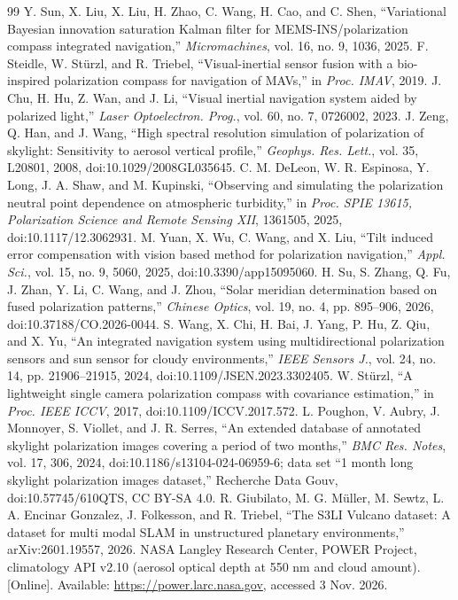 \begin{thebibliography}{99}
 Y. Sun, X. Liu, X. Liu, H. Zhao, C. Wang, H. Cao, and C. Shen, ``Variational Bayesian innovation saturation Kalman filter for MEMS-INS/polarization compass integrated navigation,'' \emph{Micromachines}, vol. 16, no. 9, 1036, 2025.
 F. Steidle, W. St\"urzl, and R. Triebel, ``Visual-inertial sensor fusion with a bio-inspired polarization compass for navigation of MAVs,'' in \emph{Proc. IMAV}, 2019.
 J. Chu, H. Hu, Z. Wan, and J. Li, ``Visual inertial navigation system aided by polarized light,'' \emph{Laser Optoelectron. Prog.}, vol. 60, no. 7, 0726002, 2023.
 J. Zeng, Q. Han, and J. Wang, ``High spectral resolution simulation of polarization of skylight: Sensitivity to aerosol vertical profile,'' \emph{Geophys. Res. Lett.}, vol. 35, L20801, 2008, doi:10.1029/2008GL035645.
 C. M. DeLeon, W. R. Espinosa, Y. Long, J. A. Shaw, and M. Kupinski, ``Observing and simulating the polarization neutral point dependence on atmospheric turbidity,'' in \emph{Proc. SPIE 13615, Polarization Science and Remote Sensing XII}, 1361505, 2025, doi:10.1117/12.3062931.
 M. Yuan, X. Wu, C. Wang, and X. Liu, ``Tilt induced error compensation with vision based method for polarization navigation,'' \emph{Appl. Sci.}, vol. 15, no. 9, 5060, 2025, doi:10.3390/app15095060.
 H. Su, S. Zhang, Q. Fu, J. Zhan, Y. Li, C. Wang, and J. Zhou, ``Solar meridian determination based on fused polarization patterns,'' \emph{Chinese Optics}, vol. 19, no. 4, pp. 895--906, 2026, doi:10.37188/CO.2026-0044.
 S. Wang, X. Chi, H. Bai, J. Yang, P. Hu, Z. Qiu, and X. Yu, ``An integrated navigation system using multidirectional polarization sensors and sun sensor for cloudy environments,'' \emph{IEEE Sensors J.}, vol. 24, no. 14, pp. 21906--21915, 2024, doi:10.1109/JSEN.2023.3302405.
 W. St\"urzl, ``A lightweight single camera polarization compass with covariance estimation,'' in \emph{Proc. IEEE ICCV}, 2017, doi:10.1109/ICCV.2017.572.
 L. Poughon, V. Aubry, J. Monnoyer, S. Viollet, and J. R. Serres, ``An extended database of annotated skylight polarization images covering a period of two months,'' \emph{BMC Res. Notes}, vol. 17, 306, 2024, doi:10.1186/s13104-024-06959-6; data set ``1 month long skylight polarization images dataset,'' Recherche Data Gouv, doi:10.57745/610QTS, CC BY-SA 4.0.
 R. Giubilato, M. G. M\"uller, M. Sewtz, L. A. Encinar Gonzalez, J. Folkesson, and R. Triebel, ``The S3LI Vulcano dataset: A dataset for multi modal SLAM in unstructured planetary environments,'' arXiv:2601.19557, 2026.
 NASA Langley Research Center, POWER Project, climatology API v2.10 (aerosol optical depth at 550 nm and cloud amount). [Online]. Available: \url{https://power.larc.nasa.gov}, accessed 3 Nov. 2026.
\end{thebibliography}
